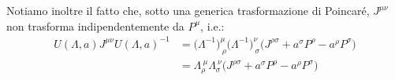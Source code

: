 \documentclass[../main.tex]{subfiles}
\begin{document}
\begin{exercise}
\begin{itemize}
        Notiamo inoltre il fatto che, sotto una generica trasformazione di Poincaré, \(J^{\mu\nu}\) non trasforma indipendentemente da $P^\mu$, i.e.: 
        \begin{equation}
        \boxed{
            \begin{aligned}
                U(\Lambda, a) J^{\mu\nu} U(\Lambda, a)^{-1} &= \big(\Lambda^{-1}\big)^\mu_{~\rho}\big(\Lambda^{-1}\big)^\nu_{~\sigma} \big( J^{\rho\sigma} + a^\sigma P^\rho - a^\rho P^\sigma \big)\\
                & = \Lambda^{~\mu}_{\rho}\Lambda^{~\nu}_{\sigma} \big( J^{\rho\sigma} + a^\sigma P^\rho - a^\rho P^\sigma \big)
            \end{aligned}}
            \label{eq:Jmunu_transform_rule}
        \end{equation}
    \end{itemize}
    
\end{exercise}
\end{document}

